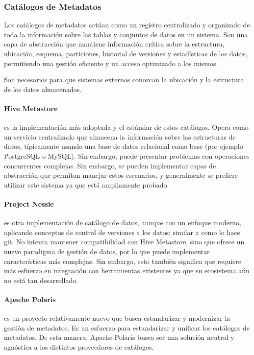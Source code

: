 \newpage

\subsubsection{Catálogos de Metadatos}
Los catálogos de metadatos actúan como un registro centralizado y organizado de toda la información sobre las tablas y conjuntos de datos en un sistema. 
Son una capa de abstracción que mantiene información crítica sobre la estructura, ubicación, esquema, particiones, historial de versiones y estadísticas de los datos, 
permitiendo una gestión eficiente y un acceso optimizado a los mismos.

Son necesarios para que sistemas externos conozcan la ubicación y la estructura de los datos almacenados. 

\paragraph{Hive Metastore} es la implementación más adoptada y el estándar de estos catálogos. Opera como un servicio centralizado que almacena la información sobre las estructuras de datos,
típicamente usando una base de datos relacional como base (por ejemplo PostgreSQL o MySQL). Sin embargo, puede presentar problemas con operaciones concurrentes complejas. 
Sin embargo, se pueden implementar capas de abstracción que permitan manejar estos escenarios, y generalmente se prefiere utilizar este sistema ya que está ampliamente probado.

\paragraph{Project Nessie} es otra implementación de catálogo de datos, aunque con un enfoque moderno, aplicando conceptos de control de versiones a los datos; similar a como lo hace git. 
No intenta mantener compatibilidad con Hive Metastore, sino que ofrece un nuevo paradigma de gestión de datos, por lo que puede implementar características más complejas. 
Sin embargo, esto también significa que requiere más esfuerzo en integración con herramientas existentes ya que su ecosistema aún no está tan desarrollado.

\paragraph{Apache Polaris} es un proyecto relativamente nuevo que busca estandarizar y modernizar la gestión de metadatos. Es un esfuerzo para estandarizar y unificar los catálogos de metadatos.
De esta manera, Apache Polaris busca ser una solución neutral y agnóstica a los distintos proveedores de catálogos.  

